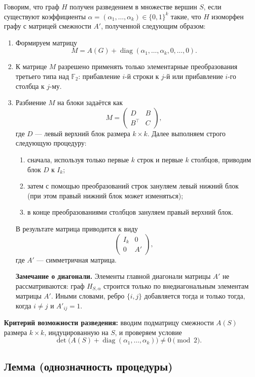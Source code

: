 \documentclass[12pt,a4paper]{article}
\begin{document}
Говорим, что граф $H$ получен разведением в множестве вершин $S$, если существуют коэффициенты $\alpha=(\alpha_1,\ldots,\alpha_k)\in\{0,1\}^k$ такие, что $H$ изоморфен графу с матрицей смежности $A'$, полученной следующим образом:
\begin{enumerate}
\item Формируем матрицу
\[
M = A(G) + \operatorname{diag}(\alpha_1,\ldots,\alpha_k,0,\ldots,0).
\]
\item К матрице $M$ разрешено применять только элементарные преобразования третьего типа над $\mathbb{F}_2$: прибавление $i$-й строки к $j$-й или прибавление $i$-го столбца к $j$-му.
\item Разбиение $M$ на блоки задаётся как
\[
M=
\begin{pmatrix}
D & B\\
B^\top & C
\end{pmatrix},
\]
где $D$ --- левый верхний блок размера $k\times k$. Далее выполняем строго следующую процедуру:
\begin{enumerate}
\item сначала, используя только первые $k$ строк и первые $k$ столбцов, приводим блок $D$ к $I_k$;
\item затем с помощью преобразований строк зануляем левый нижний блок (при этом правый нижний блок может изменяться);
\item в конце преобразованиями столбцов зануляем правый верхний блок.
\end{enumerate}
В результате матрица приводится к виду
\[
\begin{pmatrix}
I_k & 0\\
0 & A'
\end{pmatrix},
\]
где $A'$ --- симметричная матрица.

\textbf{Замечание о диагонали.}
Элементы главной диагонали матрицы $A'$ не рассматриваются:
граф $H_{S,\alpha}$ строится только по внедиагональным элементам матрицы $A'$.
Иными словами, ребро $\{i,j\}$ добавляется тогда и только тогда, когда $i\neq j$ и $A'_{ij}=1$.
\end{enumerate}

\textbf{Критерий возможности разведения:}
вводим подматрицу смежности $A(S)$ размера $k\times k$, индуцированную на $S$, и проверяем условие
\[
\det\bigl(A(S)+\operatorname{diag}(\alpha_1,\ldots,\alpha_k)\bigr)\neq 0 \pmod{2}.
\]

\subsection*{Лемма (однозначность процедуры)}
\end{document}
